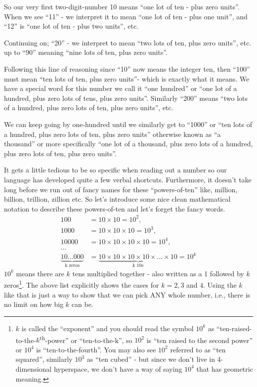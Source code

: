 \documentclass{article}
\begin{document}
So our very first two-digit-number 10 means ``one lot of ten - plus zero units''.
When we see ``11'' - we interpret it to mean ``one lot of ten - plus one unit'',
and ``12'' is ``one lot of ten - plus two units'', etc.

Continuing on; ``20'' - we interpret to mean ``two lots of ten,
plus zero units'', etc. up to ``90'' meaning ``nine lots of ten,
plus zero units''.

Following this line of reasoning since ``10'' now means the integer ten,
then ``100'' must mean ``ten lots of ten,
plus zero units''- which is exactly what it means.
We have a special word for this number we call it ``one hundred'' or ``one lot of a hundred,
plus zero lots of tens, plus zero units''.
Similarly ``200'' means ``two lots of a hundred, plus zero lots of ten,
plus zero units'', etc.

We can keep going by one-hundred until we similarly get to ``1000'' or ``ten lots of a hundred,
plus zero lots of ten, plus zero units'' otherwise known
as ``a thousand'' or more specifically ``one lot of a thousand,
plus zero lots of a hundred, plus zero lots of ten, plus zero units''.

It gets a little tedious to be so specific when reading out
a number so our language has developed quite a few verbal shortcuts.
Furthermore, it doesn't take long before we run out of fancy names
for these ``powers-of-ten'' like, million, billion, trillion,
zillion etc. So let's introduce some nice clean mathematical notation
to describe these powers-of-ten and let's forget the fancy words.
\begin{align*}
100&=10\times10=10^2,\\
1000&= 10\times10\times10=10^3,\\
10000&= 10\times10\times10\times10=10^4,\\
\dots{}\\
\underbrace{10\dots{}000}_\text{k zeros}&=
\underbrace{10\times10\times10\times10\times\dots{}\times10}_\text{k 10s}=10^k
\end{align*}
$10^k$ means there are $k$ tens multiplied together - 
also written as a 1 followed by $k$ zeros\footnote{$k$ is called the ``exponent'' and you should
read the symbol $10^k$ as ``ten-raised-to-the-$k$\textsuperscript{th}-power'' or ``ten-to-the-k'',
so $10^2$ is ``ten raised to the second power'' or $10^4$ is ``ten-to-the-fourth''.
You may also see $10^2$ referred to as ``ten squared'',
similarly $10^3$ as ``ten cubed'' - but since we 
don't live in 4-dimensional hyperspace,
we don't have a way of saying $10^4$ that has geometric meaning.}.
The above list explicitly shows the cases for $k = 2, 3$ and $4$.
Using the $k$ like that is just a way to show that we can pick ANY whole number,
i.e., there is no limit on how big $k$ can be.
\end{document}
